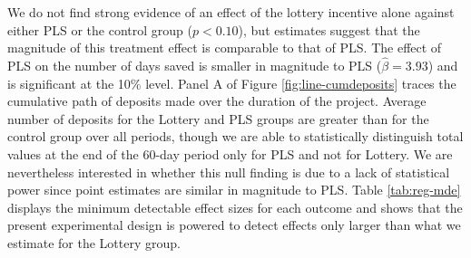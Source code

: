 \documentclass[11pt]{article}
\begin{document}
		We do not find strong evidence of an effect of the lottery incentive alone against either PLS or the control group ($p < 0.10$), but estimates suggest that the magnitude of this treatment effect is comparable to that of PLS. The effect of PLS on the number of days saved is smaller in magnitude to PLS ($\hat \beta = 3.93$) and is significant at the 10\% level. Panel A of Figure \ref{fig:line-cumdeposits} traces the cumulative path of deposits made over the duration of the project. Average number of deposits for the Lottery and PLS groups are greater than for the control group over all periods, though we are able to statistically distinguish total values at the end of the 60-day period only for PLS and not for Lottery. We are nevertheless interested in whether this null finding is due to a lack of statistical power since point estimates are similar in magnitude to PLS. Table \ref{tab:reg-mde} displays the minimum detectable effect sizes for each outcome and shows that the present experimental design is powered to detect effects only larger than what we estimate for the Lottery group.

		
\end{document}
